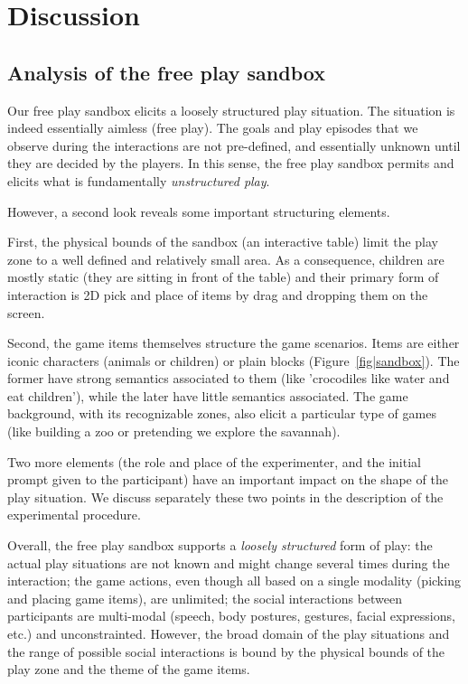 \documentclass[sigconf]{acmart}
\begin{document}

\section{Discussion}
\label{sec:discussion}

\subsection{Analysis of the free play sandbox}

Our free play sandbox elicits a loosely structured play situation. The
situation is indeed essentially aimless (free play). The goals and play episodes
that we observe during the interactions are not pre-defined, and essentially
unknown until they are decided by the players. In this sense, the free play
sandbox permits and elicits what is fundamentally \emph{unstructured play}.

However, a second look reveals some important structuring elements.

First, the physical bounds of the sandbox (an interactive table) limit the
play zone to a well defined and relatively small area. As a consequence,
children are mostly static (they are sitting in front of the table) and their
primary form of interaction is 2D pick and place of items by drag and dropping
them on the screen.

Second, the game items themselves structure the game scenarios. Items are either
iconic characters (animals or children) or plain blocks
(Figure~\ref{fig|sandbox}). The former have strong semantics associated to them
(like 'crocodiles like water and eat children'), while the later have little
semantics associated. The game background, with its recognizable zones, also
elicit a particular type of games (like building a zoo or pretending we explore
the savannah).

Two more elements (the role and place of the experimenter, and the initial
prompt given to the participant) have an important impact on the shape of the
play situation. We discuss separately these two points in the description of the
experimental procedure.

Overall, the free play sandbox supports a \emph{loosely structured} form of play: the
actual play situations are not known and might change several times during the
interaction; the game actions, even though all based on a single modality (picking and
placing game items), are unlimited; the social interactions between participants
are multi-modal (speech, body postures, gestures, facial expressions, etc.) and
unconstrainted. However, the broad domain of the play situations and the range of
possible social interactions is bound by the physical bounds of the play zone
and the theme of the game items.
\end{document}
